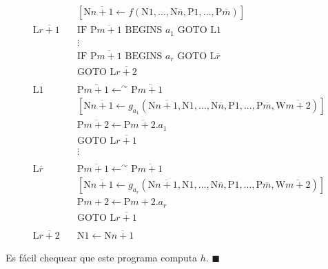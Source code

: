 \documentclass{article}
\begin{document}
\begin{align*}
\quad & [\text{N}\overline{n+1} \gets f(\text{N}1, ..., \text{N}\overline{n}, \text{P}1, ..., \text{P}\overline{m})] \\
\text{L}\overline{r+1} \text{ }& \text{IF P}\overline{m+1} \text{ BEGINS } a_1 \text{ GOTO L1} \\
& \vdots \\
& \text{IF P}\overline{m+1} \text{ BEGINS } a_r \text{ GOTO L}\overline{r} \\
& \text{GOTO L}\overline{r + 2} \\
\\
\text{L1} \quad & \text{P}\overline{m+1} \gets^\curvearrowright \text{P}\overline{m+1} \\
& [\text{N}\overline{n+1} \gets g_{a_1}(\text{N}\overline{n+1}, \text{N}1, ..., \text{N}\overline{n}, \text{P}1, ..., \text{P}\overline{m}, \text{W}\overline{m+2})] \\
& \text{P}\overline{m+2} \gets \text{P}\overline{m+2}. a_1 \\
& \text{GOTO L}\overline{r+1} \\
& \vdots \\
\\
\text{L}\overline{r} \quad & \text{P}\overline{m+1} \gets^\curvearrowright \text{P}\overline{m+1} \\
& [\text{N}\overline{n+1} \gets g_{a_r}(\text{N}\overline{n+1}, \text{N}1, ..., \text{N}\overline{n}, \text{P}1, ..., \text{P}\overline{m}, \text{W}\overline{m+2})] \\
& \text{P}m+2 \gets \text{P}m + 2 . a_r \\
& \text{GOTO L}\overline{r+1} \\
\\
\text{L}\overline{r+2} \quad & \text{N}1 \gets \text{N}\overline{n+1}
\end{align*}

Es fácil chequear que este programa computa $h$.  \hfill $\blacksquare$
\end{document}
